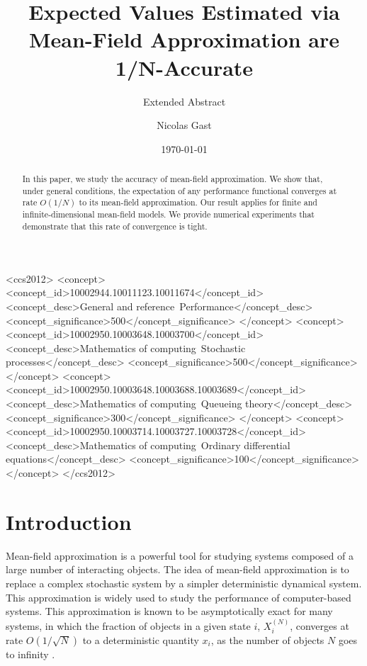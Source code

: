 \documentclass[sigconf]{acmart}
\title{Expected Values Estimated via Mean-Field Approximation are
  1/N-Accurate}%
\subtitle{Extended Abstract}%
\author{Nicolas Gast}
\affiliation{%
  \institution{Inria}%
  \streetaddress{Univ. Grenoble Alpes, CNRS, LIG}%
  \city{ Grenoble} %
  \state{France} %
  \postcode{F-38000}%
}%
\date{\today}
\newcommand\XN{X^{(N)}}
\begin{document}
\begin{abstract}
  In this paper, we study the accuracy of mean-field approximation.
  We show that, under general conditions, the expectation of any
  performance functional converges at rate $O(1/N)$ to its mean-field
  approximation.  Our result applies for finite and
  infinite-dimensional mean-field models.  We provide numerical
  experiments that demonstrate that this rate of convergence is tight.
\end{abstract}

\begin{CCSXML}
<ccs2012>
<concept>
<concept_id>10002944.10011123.10011674</concept_id>
<concept_desc>General and reference~Performance</concept_desc>
<concept_significance>500</concept_significance>
</concept>
<concept>
<concept_id>10002950.10003648.10003700</concept_id>
<concept_desc>Mathematics of computing~Stochastic processes</concept_desc>
<concept_significance>500</concept_significance>
</concept>
<concept>
<concept_id>10002950.10003648.10003688.10003689</concept_id>
<concept_desc>Mathematics of computing~Queueing theory</concept_desc>
<concept_significance>300</concept_significance>
</concept>
<concept>
<concept_id>10002950.10003714.10003727.10003728</concept_id>
<concept_desc>Mathematics of computing~Ordinary differential equations</concept_desc>
<concept_significance>100</concept_significance>
</concept>
</ccs2012>
\end{CCSXML}



\maketitle

\section{Introduction}

Mean-field approximation is a powerful tool for studying systems
composed of a large number of interacting objects. The idea of
mean-field approximation is to replace a complex stochastic system by
a simpler deterministic dynamical system.  This approximation is
widely used to study the performance of computer-based systems.
This approximation is known to be asymptotically exact for many
systems, in which the fraction of objects in a given state $i$,
$\XN_i$, converges at rate $O(1/\sqrt{N})$ to a deterministic quantity
$x_i$, as the number of objects $N$ goes to infinity
\cite{kurtz70,ying2016rate}.
\end{document}
